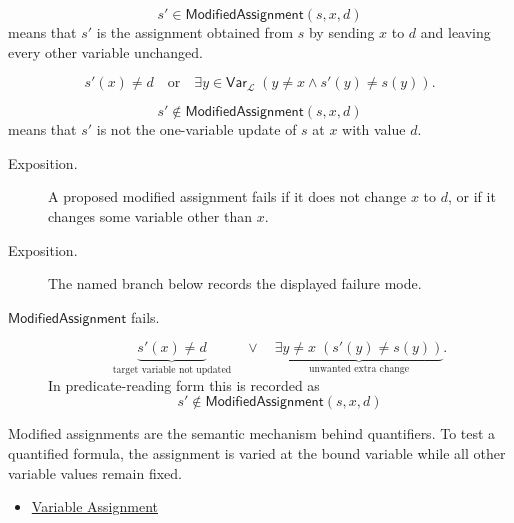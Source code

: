 \begin{remark*}
\[
  s'\in\mathsf{ModifiedAssignment}(s,x,d)
\] means that \(s'\) is the
assignment obtained from \(s\) by sending \(x\) to \(d\) and leaving every
other variable unchanged.
\end{remark*}

\begin{remark*}
\[
s'(x)\neq d
\quad\text{or}\quad
\exists y\in\mathsf{Var}_{\mathcal L}\;(y\neq x\land s'(y)\neq s(y)).
\]
\end{remark*}

\begin{remark*}
\[
  s'\notin\mathsf{ModifiedAssignment}(s,x,d)
\] means that \(s'\) is not the
one-variable update of \(s\) at \(x\) with value \(d\).
\end{remark*}

\begin{remark*}
\begin{description}
  \item[Exposition.] A proposed modified assignment fails if it does not change \(x\) to \(d\), or
if it changes some variable other than \(x\).
\end{description}
\end{remark*}

\begin{remark*}
\begin{description}
  \item[Exposition.] The named branch below records the displayed failure mode.
\item[\(\mathsf{ModifiedAssignment}\) fails.] \[
\underbrace{s'(x)\neq d}_{\text{target variable not updated}}
\quad\lor\quad
\underbrace{\exists y\neq x\;(s'(y)\neq s(y))}_{\text{unwanted extra change}}.
\]
  In predicate-reading form this is recorded as
  \[
    s'\notin\mathsf{ModifiedAssignment}(s,x,d)
  \]
\end{description}
\end{remark*}

\begin{remark*}[Interpretation]
Modified assignments are the semantic mechanism behind quantifiers. To test a
quantified formula, the assignment is varied at the bound variable while all
other variable values remain fixed.
\end{remark*}

\begin{dependencies}
\begin{itemize}
  \item \hyperref[def:var-assign]{Variable Assignment}
\end{itemize}
\end{dependencies}


